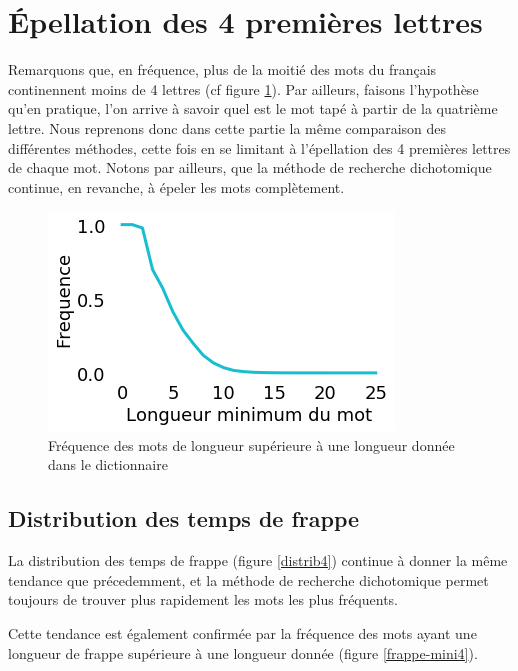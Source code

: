 \documentclass[twoside,twocolumn]{article}
\begin{document}
\section{Épellation des 4 premières lettres}

Remarquons que, en fréquence, plus de la moitié des mots du français continennent moins de 4 lettres (cf figure \ref{dico}). Par ailleurs, faisons l'hypothèse qu'en pratique, l'on arrive à savoir quel est le mot tapé à partir de la quatrième lettre. Nous reprenons donc dans cette partie la même comparaison des différentes méthodes, cette fois en se limitant à l'épellation des 4 premières lettres de chaque mot. Notons par ailleurs, que la méthode de recherche dichotomique continue, en revanche, à épeler les mots complètement.

\begin{center}
\begin{figure}
  \includegraphics[scale=0.55]{dico.png}
  \caption{Fréquence des mots de longueur supérieure à une longueur donnée dans le dictionnaire}
  \label{dico}
\end{figure}
\end{center}
\subsection{Distribution des temps de frappe}

La distribution des temps de frappe (figure \ref{distrib4}) continue à donner la même tendance que précedemment, et la méthode de recherche dichotomique permet toujours de trouver plus rapidement les mots les plus fréquents.

Cette tendance est également confirmée par la fréquence des mots ayant une longueur de frappe supérieure à une longueur donnée (figure \ref{frappe-mini4}).
\end{document}
